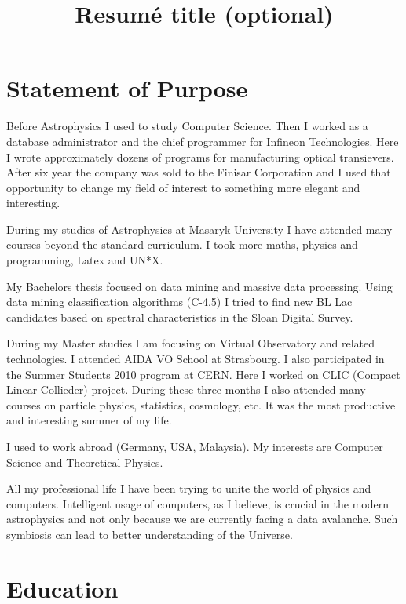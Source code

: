 \documentclass[11pt,a4paper]{moderncv}
\title{Resumé title (optional)}               %
\begin{document}
\maketitle

\section{Statement of Purpose}
\vspace{5mm}
\setlength{\parindent}{5mm}

\noindent Before Astrophysics I used to study Computer Science. Then I worked as
a database administrator and the chief programmer for Infineon
Technologies. Here I wrote approximately dozens of programs for manufacturing
optical transievers. After six year the company was sold to the
Finisar Corporation and I used that opportunity to change my field of
interest to something more elegant and interesting.


\indent During my studies of Astrophysics at Masaryk University I have attended
many courses beyond the standard curriculum. I took more maths, physics and
programming, Latex and UN*X.


\indent My Bachelors thesis focused on data mining and massive data
processing. Using data mining classification algorithms (C-4.5) I
tried to find new BL Lac candidates based on spectral characteristics
in the Sloan Digital Survey.


\indent During my Master studies I am focusing on Virtual Observatory and
related technologies. I attended AIDA VO School at Strasbourg. I also
participated in the Summer Students 2010 program at CERN. Here I
worked on CLIC (Compact Linear Collieder) project. During these three
months I also attended many courses on particle physics,
statistics, cosmology, etc. It was the most productive and interesting
summer of my life.


\indent I used to work abroad (Germany, USA, Malaysia). My interests are
Computer Science and Theoretical Physics.


\indent All my professional life I have been trying to unite the world of
physics and computers. Intelligent usage of computers, as I believe, is
crucial in the modern astrophysics and not only because we are
currently facing a data avalanche. Such symbiosis can lead to better
understanding of the Universe.

\newpage

\section{Education}
\end{document}
